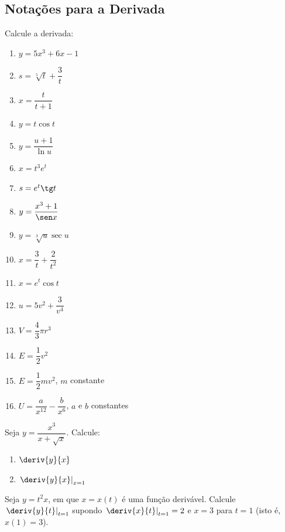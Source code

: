 \subsection{Notações para a Derivada}

\begin{exercicio}[1]
Calcule a derivada:
\begin{enumerate}[label=\alph*)]
    \item $y = 5x^3 + 6x - 1$
    \item $s = \sqrt[5]{t} + \dfrac{3}{t}$
    \item $x = \dfrac{t}{t + 1}$
    \item $y = t \cos t$
    \item $y = \dfrac{u + 1}{\ln u}$
    \item $x = t^3 e^t$
    \item $s = e^t \tg t$
    \item $y = \dfrac{x^3 + 1}{\sen x}$
    \item $y = \sqrt[3]{u} \sec u$
    \item $x = \dfrac{3}{t} + \dfrac{2}{t^2}$
    \item $x = e^t \cos t$
    \item $u = 5v^2 + \dfrac{3}{v^4}$
    \item $V = \dfrac{4}{3}\pi r^3$
    \item $E = \dfrac{1}{2}v^2$
    \item $E = \dfrac{1}{2}mv^2$, $m$ constante
    \item $U = \dfrac{a}{x^{12}} - \dfrac{b}{x^6}$, $a$ e $b$ constantes
\end{enumerate}
\end{exercicio}

\begin{exercicio}[2]
Seja $y = \dfrac{x^3}{x + \sqrt{x}}$. Calcule:
\begin{enumerate}[label=\alph*)]
    \item $\deriv{y}{x}$
    \item $\left.\deriv{y}{x}\right|_{x = 1}$
\end{enumerate}
\end{exercicio}

\begin{exercicio}[3]
Seja $y = t^2 x$, em que $x = x(t)$ é uma função derivável. Calcule $\left.\deriv{y}{t}\right|_{t = 1}$ supondo $\left.\deriv{x}{t}\right|_{t = 1} = 2$ e $x = 3$ para $t = 1$ (isto é, $x(1) = 3$).
\end{exercicio}

